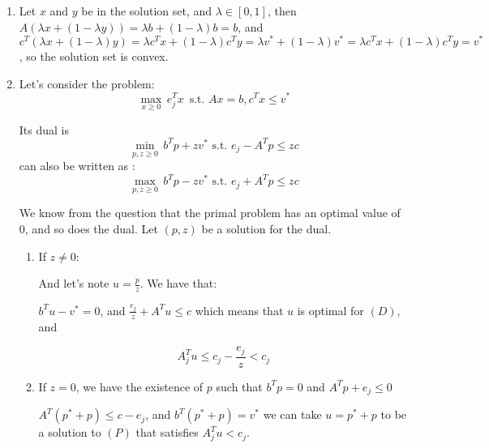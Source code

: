 \documentclass[12pt]{article}
\begin{document}
\begin{enumerate}
\item Let $x$ and $y$ be in the solution set, and $\lambda \in [0,1]$, then $A (\lambda x + (1-\lambda y)) = \lambda b + (1-\lambda)b = b$, and $c^T(\lambda x + (1-\lambda)y) = \lambda c^T x + (1-\lambda)c^T y =\lambda v^* + (1-\lambda)v^* = \lambda c^T x + (1-\lambda)c^T y = v^*$, so the solution set is convex.
\item 

Let's consider the problem:
$$\max_{x \geq 0} \,  e_j^Tx \, \text{ s.t. } Ax = b, c^Tx \leq v^*$$

Its dual is
$$\min_{p, z \geq 0} \, b^Tp + zv^* \text{ s.t. } e_j - A^Tp \leq zc$$
can also be written as :
$$\max_{p, z \geq 0} \,  b^Tp - zv^* \text{ s.t. } e_j + A^Tp \leq zc$$


We know from the question that the primal problem has an optimal value of 0, and so does the dual. Let $(p, z)$ be a solution for the dual. 


\begin{enumerate}
\item
If $z \neq 0$:

And let's note $u = \frac p z$. We have that:

$b^Tu - v^* = 0$, and $\frac{e_j}{z} + A^Tu \leq c$
which means that $u$ is optimal for $(D)$, and

$$A_j^Tu \leq c_j - \frac{e_j}{z} < c_j$$


\item 
If $z = 0$, we have the existence of $p$ such that $b^Tp = 0$ and $A^Tp + e_j \leq 0$

$A^T(p^* + p) \leq c - e_j$, and $b^T(p^* + p) = v^*$
we can take $u = p^* + p$ to be a solution to $(P)$ that satisfies $A_j^Tu < c_j$.


\end{enumerate}


\end{enumerate}
\end{document}
